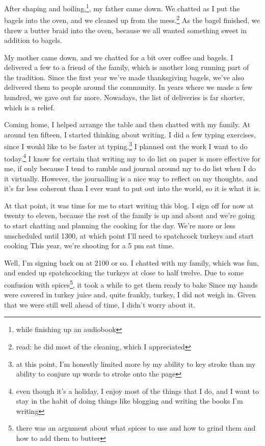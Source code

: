 \documentclass[12pt]{article}[titlepage]
\newcommand{\1}{\={a}}
\newcommand{\2}{\={e}}
\newcommand{\3}{\={\i}}
\newcommand{\4}{\=o}
\newcommand{\5}{\=u}
\newcommand{\6}{\={A}}
\renewcommand{\,}{\textsuperscript{,}}
\begin{document}
After shaping and boiling,\footnote{while finishing up an audiobook}, my father came down.
We chatted as I put the bagels into the oven, and we cleaned up from the mess.\footnote{read: he did most of the cleaning, which I appreciated}
As the bagel finished, we threw a butter braid into the oven, because we all wanted something sweet in addition to bagels.

My mother came down, and we chatted for a bit over coffee and bagels.
I delivered a few to a friend of the family, which is another long running part of the tradition.
Since the first year we've made thanksgiving bagels, we've also delivered them to people around the community.
In years where we made a few hundred, we gave out far more.
Nowadays, the list of deliveries is far shorter, which is a relief.

Coming home, I helped arrange the table and then chatted with my family.
At around ten fifteen, I started thinking about writing.
I did a few typing exercises, since I would like to be faster at typing.\footnote{at this point, I'm honestly limited more by my ability to key stroke than my ability to conjure up words to stroke onto the page}
I planned out the work I want to do today.\footnote{even though it's a holiday, I enjoy most of the things that I do, and I want to stay in the habit of doing things like blogging and writing the books I'm writing}
I know for certain that writing my to do list on paper is more effective for me, if only because I tend to ramble and journal around my to do list when I do it virtually.
However, the journalling is a nice way to reflect on my thoughts, and it's far less coherent than I ever want to put out into the world, so it is what it is.

At that point, it was time for me to start writing this blog.
I sign off for now at twenty to eleven, because the rest of the family is up and about and we're going to start chatting and planning the cooking for the day.
We're more or less unscheduled until 1300, at which point I'll need to spatchcock turkeys and start cooking
This year, we're shooting for a 5 pm eat time.

Well, I'm signing back on at 2100 or so.
I chatted with my family, which was fun, and ended up spatchcocking the turkeys at close to half twelve.
Due to some confusion with spices\footnote{there was an argument about what spices to use and how to grind them and how to add them to butter}, it took a while to get them ready to bake
Since my hands were covered in turkey juice and, quite frankly, turkey, I did not weigh in.
Given that we were still well ahead of time, I didn't worry about it.
\end{document}
